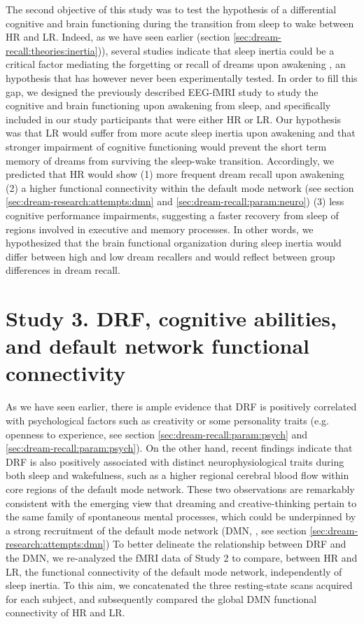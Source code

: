 The second objective of this study was to test the hypothesis of a differential cognitive and brain functioning during the transition from sleep to wake between HR and LR. Indeed, as we have seen earlier (section \ref{sec:dream-recall:theories:inertia})), several studies indicate that sleep inertia could be a critical factor mediating the forgetting or recall of dreams upon awakening \citep{schredl_factors_2003, conduit_poor_2004}, an hypothesis that has however never been experimentally tested. In order to fill this gap, we designed the previously described EEG-fMRI study to study the cognitive and brain functioning upon awakening from sleep, and specifically included in our study participants that were either HR or LR. Our hypothesis was that LR would suffer from more acute sleep inertia upon awakening and that stronger impairment of cognitive functioning would prevent the short term memory of dreams from surviving the sleep-wake transition. Accordingly, we predicted that HR would show (1) more frequent dream recall upon awakening (2) a higher functional connectivity within the default mode network (see section \ref{sec:dream-research:attempts:dmn} and \ref{sec:dream-recall:param:neuro}) (3) less cognitive performance impairments, suggesting a faster recovery from sleep of regions involved in executive and memory processes. In other words, we hypothesized that the brain functional organization during sleep inertia would differ between high and low dream recallers and would reflect between group differences in dream recall.

\section{Study 3. DRF, cognitive abilities, and default network functional connectivity}
\label{sec:problematic:dmn-crea}

As we have seen earlier, there is ample evidence that DRF is positively correlated with psychological factors such as creativity or some personality traits (e.g. openness to experience, see section \ref{sec:dream-recall:param:psych} and \ref{sec:dream-recall:param:psych}). On the other hand, recent findings indicate that DRF is also positively associated with distinct neurophysiological traits during both sleep and wakefulness, such as a higher regional cerebral blood flow within core regions of the default mode network. These two observations are remarkably consistent with the emerging view that dreaming and creative-thinking pertain to the same family of spontaneous mental processes, which could be underpinned by a strong recruitment of the default mode network (DMN, \citealp{christoff_mind-wandering_2016}, see section \ref{sec:dream-research:attempts:dmn}) To better delineate the relationship between DRF and the DMN, we re-analyzed the fMRI data of Study 2 to compare, between HR and LR, the functional connectivity of the default mode network, independently of sleep inertia. To this aim, we concatenated the three resting-state scans acquired for each subject, and subsequently compared the global DMN functional connectivity of HR and LR.


